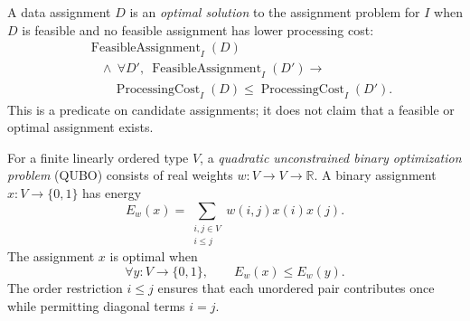 \begin{definition}\label{def:optimal-assignment}
A data assignment $D$ is an \emph{optimal solution} to the assignment problem
for $I$ when $D$ is feasible and no feasible assignment has lower processing
cost:
\[
  \begin{aligned}
    &\operatorname{FeasibleAssignment}_I(D) \\
    &\quad\wedge\ \forall D',\
      \operatorname{FeasibleAssignment}_I(D') \longrightarrow \\
    &\qquad \operatorname{ProcessingCost}_I(D)
      \leq \operatorname{ProcessingCost}_I(D').
  \end{aligned}
\]
This is a predicate on candidate assignments; it does not claim that a feasible
or optimal assignment exists.
\end{definition}

\begin{definition}\label{def:qubo}
For a finite linearly ordered type $V$, a \emph{quadratic unconstrained binary
optimization problem} (QUBO) consists of real weights
$w:V\to V\to\mathbb{R}$. A binary assignment $x:V\to\{0,1\}$ has energy
\[
  E_w(x)=\sum_{\substack{i,j\in V\\ i\leq j}} w(i,j)x(i)x(j).
\]
The assignment $x$ is optimal when
\[
  \forall y:V\to\{0,1\}, \qquad E_w(x)\leq E_w(y).
\]
The order restriction $i\leq j$ ensures that each unordered pair contributes
once while permitting diagonal terms $i=j$.
\end{definition}
